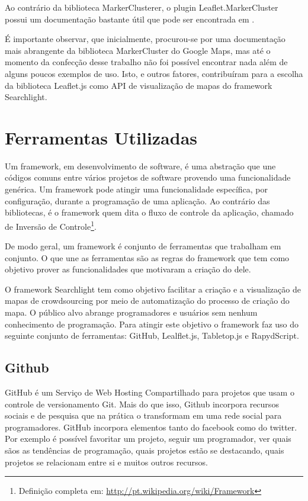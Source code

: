 		Ao contrário da biblioteca MarkerClusterer, o plugin Leaflet.MarkerCluster possui um documentação bastante útil que pode ser encontrada em \cite{gitleafletmarker}. 
		
		É importante observar, que inicialmente, procurou-se por uma documentação mais abrangente da biblioteca MarkerCluster do Google Maps, mas até o momento da confecção desse trabalho não foi possível encontrar nada além de alguns poucos exemplos de uso. Isto, e outros fatores, contribuíram para a escolha da biblioteca Leaflet.js como API de visualização de mapas do framework Searchlight.
		  

\section{Ferramentas Utilizadas}

Um framework, em desenvolvimento de software, é uma abstração que une códigos comuns entre vários projetos de software provendo uma funcionalidade genérica. Um framework pode atingir uma funcionalidade específica, por configuração, durante a programação de uma aplicação. Ao contrário das bibliotecas, é o framework quem dita o fluxo de controle da aplicação, chamado de Inversão de Controle\footnote{Definição completa em: \url{http://pt.wikipedia.org/wiki/Framework}}.

De modo geral, um framework é conjunto de ferramentas que trabalham em conjunto. O que une as ferramentas são as regras do framework que tem como objetivo prover as funcionalidades que motivaram a criação do dele.

O framework Searchlight tem como objetivo facilitar a criação e a visualização de mapas de crowdsourcing por meio de automatização do processo de criação do mapa. O público alvo abrange  programadores e usuários sem nenhum conhecimento de programação. Para atingir este objetivo o framework faz uso do seguinte conjunto de ferramentas: GitHub, Lealflet.js,  Tabletop.js e RapydScript. 



\subsection{Github\label{github}}
GitHub é um Serviço de Web Hosting Compartilhado para projetos que usam o controle de versionamento Git. Mais do que isso, Github incorpora recursos sociais e de pesquisa que na prática o transformam em uma rede social para programadores. GitHub incorpora elementos tanto do facebook como do twitter. Por exemplo é possível favoritar um projeto, seguir um programador, ver quais sãos as tendências de programação, quais projetos estão se destacando, quais projetos se relacionam entre si e muitos outros recursos.

